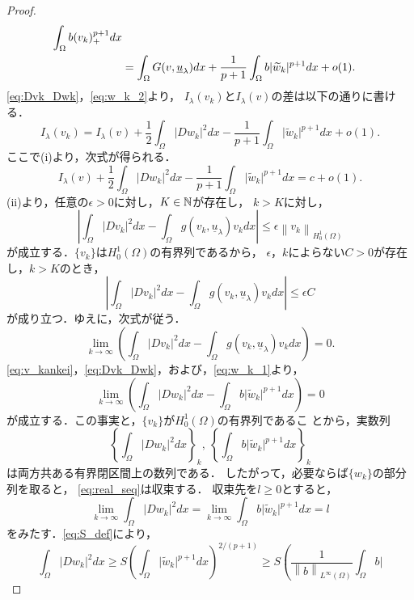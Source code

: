 \begin{proof}
\begin{align}
  \int_\Omega b (v_k)_+^{p+1} dx \notag \\
  &= \int_\Omega G(v, \underline{u}_\lambda) dx + \frac{1}{p+1}
  \int_\Omega b \lvert \tilde{w}_k \rvert^{p+1} dx + o(1). \label{eq:w_k_2}
 \end{align}
 \eqref{eq:Dvk_Dwk}，\eqref{eq:w_k_2}より，
 $I_\lambda(v_k)$と$I_\lambda(v)$の差は以下の通りに書ける．
 \[
  I_\lambda(v_k) = I_\lambda(v) + \frac{1}{2} \int_\Omega \lvert Dw_k
 \rvert^2 dx - \frac{1}{p+1} \int_\Omega \lvert \tilde{w}_k
 \rvert^{p+1} dx + o(1).
 \]
 ここで(i)より，次式が得られる．
 \begin{equation}
  I_\lambda(v) + \frac{1}{2} \int_\Omega \lvert Dw_k
   \rvert^2 dx - \frac{1}{p+1} \int_\Omega \lvert \tilde{w}_k
   \rvert^{p+1} dx = c + o(1). \label{eq:w_k_c}
 \end{equation}
 (ii)より，任意の$\epsilon > 0$に対し，$K \in \N$が存在し，
 $k > K$に対し，
 \[
 \left\lvert \int_\Omega \lvert Dv_k \rvert^2 dx - \int_\Omega g(v_k,
 \underline{u}_\lambda) v_k dx \right\rvert \leq \epsilon \left\| v_k
 \right\|_{H_0^1(\Omega)} 
 \]
 が成立する．$\{ v_k \}$は$H_0^1(\Omega)$の有界列であるから，
 $\epsilon$，$k$によらない$C > 0$が存在し，$k > K$のとき，
 \[
 \left\lvert \int_\Omega \lvert Dv_k \rvert^2 dx - \int_\Omega g(v_k,
 \underline{u}_\lambda) v_k dx \right\rvert \leq \epsilon C
 \]
 が成り立つ．ゆえに，次式が従う．
 \[
 \lim_{k \to \infty} \left( \int_\Omega \lvert Dv_k \rvert^2 dx -
 \int_\Omega g(v_k, \underline{u}_\lambda) v_k dx \right) = 0.
 \]
 \eqref{eq:v_kankei}，\eqref{eq:Dvk_Dwk}，および，\eqref{eq:w_k_1}より，
 \[
 \lim_{k \to \infty} \left( \int_\Omega \lvert Dw_k \rvert^2 dx -
 \int_\Omega b \lvert \tilde{w}_k \rvert^{p+1} dx \right) = 0 
 \]
 が成立する．この事実と，$\{ v_k \}$が$H_0^1(\Omega)$の有界列であるこ
 とから，実数列
 \begin{equation}
  \left\{ \int_\Omega \lvert Dw_k \rvert^2 dx \right\}_k , \ 
  \left\{ \int_\Omega b \lvert \tilde{w}_k \rvert^{p+1} dx \right\}_k
  \label{eq:real_seq}
 \end{equation}
 は両方共ある有界閉区間上の数列である．
 したがって，必要ならば$\{ w_k \}$の部分列を取ると，
 \eqref{eq:real_seq}は収束する．
 収束先を$l \geq 0$とすると，
 \[
  \lim_{k \to \infty} \int_\Omega \lvert Dw_k \rvert^2 dx = \lim_{k
 \to \infty} \int_\Omega b \lvert \tilde{w}_k \rvert^{p+1} dx = l
 \]
 をみたす．\eqref{eq:S_def}により，
 \[
  \int_\Omega \lvert Dw_k \rvert^2 dx \geq S \left( \int_\Omega \lvert
 \tilde{w}_k \rvert^{p+1} dx \right)^{2/(p+1)} \geq S \left(
 \frac{1}{\left\| b \right\|_{L^\infty(\Omega)}} \int_\Omega b \lvert
\]
\end{proof}

